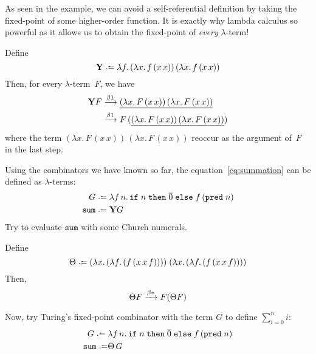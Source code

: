 As seen in the example, we can avoid a self-referential definition by taking the
fixed-point of some higher-order function. It is exactly why lambda calculus so
powerful as it allows us to obtain the fixed-point of \emph{every}
$\lambda$-term!
\begin{proposition}
  Define
  \[
    \mathbf{Y} \defeq
    \lambda f.\, (\lambda x.\, f\,(x\,x))\,(\lambda x.\,f\,(x\,x))
  \]
  Then, for every $\lambda$-term~$F$, we have
  \begin{align*}
    \mathbf{Y}F
    & \xrightarrow{\beta1} \underline{(\lambda x.\,F\,(x\,x))\,(\lambda x.\, F\,(x\,x))} \\
    & \xrightarrow{\beta1} F\,(\underline{(\lambda x.\,F\,(x\,x))\,(\lambda x.\,
      F\,(x\,x))})
  \end{align*}
  where the term $(\lambda x.\,F\,(x\,x))\,(\lambda x.\, F\,(x\,x))$
  reoccur as the argument of~$F$ in the last step.
\end{proposition}
\begin{example}
  Using the combinators we have known so far, the equation~\eqref{eq:summation}
  can be defined as $\lambda$-terms:
  \begin{align*}
    G \defeq{} &
    \lambda f\,n.\, \mathtt{if}\;n\;\mathtt{then}\;\overline{0}\;\mathtt{else}\;
    f\,(\mathtt{pred}\;n) \\
    \mathtt{sum} \defeq{} & \mathbf{Y}G
  \end{align*}
  Try to evaluate $\mathtt{sum}$ with some Church numerals.
\end{example}

\begin{proposition}
  Define 
  \[
    \Theta \defeq 
    (\lambda x.\,(\lambda f.\,(f\,(x\,x\,f))))\;
    (\lambda x.\,(\lambda f.\,(f\,(x\,x\,f))))
  \]
  Then, 
  \[
    \Theta F \xrightarrow{\beta*} F (\Theta F)
  \]
\end{proposition}
\begin{example}
  Now, try Turing's fixed-point combinator with the term $G$ to define
  $\sum_{i=0}^n i$:
  \begin{align*}
    G \defeq{} &
    \lambda f\,n.\,
    \mathtt{if}\;n\;\mathtt{then}\;\overline{0}\;\mathtt{else}\;
    f\,(\mathtt{pred}\;n) \\
    \mathtt{sum} \defeq & \Theta\,G \\
  \end{align*}
\end{example}

